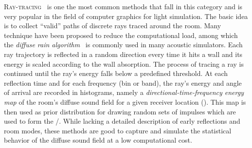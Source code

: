 \textsc{Ray-tracing}~ is one the most common methods that fall in this category and is very popular in the field of computer graphics for light simulation.
The basic idea is to collect ``valid'' paths of discrete rays traced around the room.
Many technique have been proposed to reduce the computational load, among which the \textit{diffuse rain algorithm}~ is commonly used in many acoustic simulators.
Each ray trajectory is reflected in a random direction every time it hits a wall and its energy is scaled according to the wall absorption.
The process of tracing a ray is continued until the ray’s energy falls below a predefined threshold.
At each reflection time and for each frequency (bin or band), the ray's energy and angle of arrival are recorded in histograms,
namely a \textit{directional-time-frequency energy map} of the room’s diffuse sound field for a given receiver location ().
This map is then used as prior distribution for drawing random sets of impulses which are used to form the \RIR/.
While lacking a detailed description of early reflections and room modes,
these methods are good to capture and simulate the statistical behavior of the diffuse sound field at a low computational cost.


